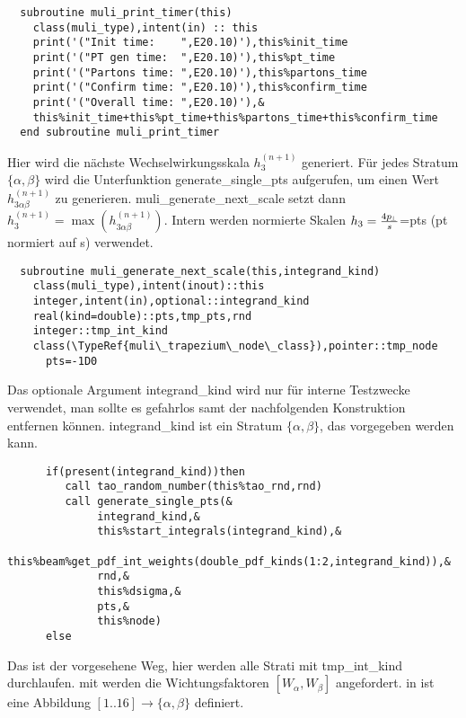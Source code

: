 \begin{Verbatim}
  subroutine muli_print_timer(this)
    class(muli_type),intent(in) :: this
    print('("Init time:    ",E20.10)'),this%init_time
    print('("PT gen time:  ",E20.10)'),this%pt_time
    print('("Partons time: ",E20.10)'),this%partons_time
    print('("Confirm time: ",E20.10)'),this%confirm_time
    print('("Overall time: ",E20.10)'),&
    this%init_time+this%pt_time+this%partons_time+this%confirm_time
  end subroutine muli_print_timer
\end{Verbatim}

Hier wird die nächste Wechselwirkungsskala $h_3^{(n+1)}$ generiert. Für jedes Stratum $\{\alpha,\beta\}$ wird die Unterfunktion generate\_single\_pts aufgerufen, um einen Wert $h_{3\alpha\beta}^{(n+1)}$ zu generieren. muli\_generate\_next\_scale setzt dann $h_3^{(n+1)}=\max(h_{3\alpha\beta}^{(n+1)})$. Intern werden normierte Skalen $h_3=\frac{4p_{\!\perp}}{s}$=pts (pt normiert auf s) verwendet.
\begin{Verbatim}
  subroutine muli_generate_next_scale(this,integrand_kind)
    class(muli_type),intent(inout)::this
    integer,intent(in),optional::integrand_kind
    real(kind=double)::pts,tmp_pts,rnd
    integer::tmp_int_kind
    class(\TypeRef{muli\_trapezium\_node\_class}),pointer::tmp_node
      pts=-1D0
\end{Verbatim}
Das optionale Argument integrand\_kind wird nur für interne Testzwecke verwendet, man sollte es gefahrlos samt der nachfolgenden Konstruktion entfernen können. integrand\_kind ist ein Stratum $\{\alpha,\beta\}$, das vorgegeben werden kann.
\begin{Verbatim}
      if(present(integrand_kind))then
         call tao_random_number(this%tao_rnd,rnd)
         call generate_single_pts(&
              integrand_kind,&
              this%start_integrals(integrand_kind),&
              this%beam%get_pdf_int_weights(double_pdf_kinds(1:2,integrand_kind)),&
              rnd,&
              this%dsigma,&
              pts,&
              this%node)
      else
\end{Verbatim}
Das ist der vorgesehene Weg, hier werden alle Strati mit tmp\_int\_kind durchlaufen. mit\linebreak {} werden die Wichtungsfaktoren $[W_\alpha,W_\beta]$ angefordert. in  ist eine Abbildung $[1..16]\rightarrow\{\alpha,\beta\}$ definiert.

